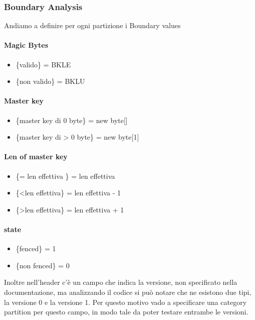 \documentclass[12pt, a4paper]{article}
\begin{document}
\subsubsection{Boundary Analysis}
Andiamo a definire per ogni partizione i Boundary values

\paragraph{Magic Bytes}
\begin{itemize}
  \item \{valido\} = BKLE
  \item \{non valido\} = BKLU 
\end{itemize}

\paragraph{Master key}
\begin{itemize}
  \item \{master key di 0 byte\} = new byte[]
  \item \{master key di > 0 byte\} = new byte[1]
\end{itemize}

\paragraph{Len of master key}
\begin{itemize}
  \item \{= len effettiva \} = len effettiva
  \item \{\textless len effettiva\} = len effettiva - 1
  \item \{\textgreater len effettiva\} = len effettiva + 1
\end{itemize}

\paragraph{state}
\begin{itemize}
  \item \{fenced\} = 1
  \item \{non fenced\} = 0
\end{itemize}

Inoltre nell'header c'è un campo che indica la versione, non specificato nella documentazione, ma
analizzando il codice si può notare che ne esistono due tipi, la versione 0 e la versione 1. Per questo motivo
vado a specificare una category partition per questo campo, in modo tale da poter testare entrambe le versioni.
\end{document}
